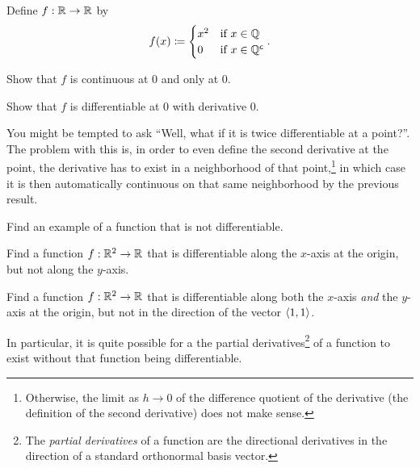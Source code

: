 \begin{exm}
Define $f:\mathbb{R} \rightarrow \mathbb{R}$ by
\begin{equation}
f(x)\coloneqq \begin{cases}x^2 & \text{if }x\in \mathbb{Q} \\ 0 & \text{if }x\in \mathbb{Q} ^{\mathsf{c}}\end{cases}.
\end{equation}
\begin{exr}
Show that $f$ is continuous at $0$ and only at $0$.
\end{exr}
\begin{exr}
Show that $f$ is differentiable at $0$ with derivative $0$.
\end{exr}
\begin{rmk}
You might be tempted to ask ``Well, what if it is twice differentiable at a point?''.  The problem with this is, in order to even define the second derivative at the point, the derivative has to exist in a neighborhood of that point,\footnote{Otherwise, the limit as $h\to 0$ of the difference quotient of the derivative (the definition of the second derivative) does not make sense.} in which case it is then automatically continuous on that same neighborhood by the previous result.
\end{rmk}
\end{exm}
\begin{exr}
Find an example of a function that is not differentiable.
\end{exr}
\begin{exr}
Find a function $f:\mathbb{R} ^2\rightarrow \mathbb{R}$ that is differentiable along the $x$-axis at the origin, but not along the $y$-axis.
\end{exr}
\begin{exr}
Find a function $f:\mathbb{R} ^2\rightarrow \mathbb{R}$ that is differentiable along both the $x$-axis \emph{and} the $y$-axis at the origin, but not in the direction of the vector $\langle1,1\rangle$.
\begin{rmk}
In particular, it is quite possible for a the partial derivatives\footnote{The \emph{partial derivatives} of a function are the directional derivatives in the direction of a standard orthonormal basis vector.} of a function to exist without that function being differentiable.
\end{rmk}
\end{exr}
